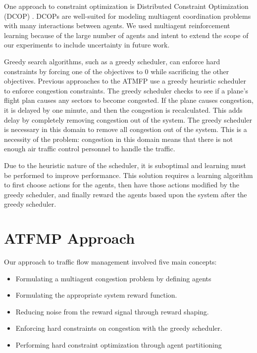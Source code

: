 \documentclass{aamas2014}
\begin{document}
One approach to constraint optimization is Distributed Constraint Optimization (DCOP) \cite{Junges:2008:EPD:1402298.1402308, Modi:2005:AAD:1120120.1120127}. DCOPs are well-suited for modeling multiagent coordination problems with many interactions between agents. We used multiagent reinforcement learning because of the large number of agents and intent to extend the scope of our experiments to include uncertainty in future work.

Greedy search algorithms, such as a greedy scheduler, can enforce hard constraints by forcing one of the objectives to 0 while sacrificing the other objectives. Previous approaches to the ATMFP use a greedy heuristic scheduler \cite{Rios} to enforce congestion constraints. The greedy scheduler checks to see if a plane's flight plan causes any sectors to become congested. If the plane causes congestion, it is delayed by one minute, and then the congestion is recalculated. This adds delay by completely removing congestion out of the system. The greedy scheduler is necessary in this domain to remove all congestion out of the system. This is a necessity of the problem: congestion in this domain means that there is not enough air traffic control personnel to handle the traffic.

Due to the heuristic nature of the scheduler, it is suboptimal and learning must be performed to improve performance. This solution requires a learning algorithm to first choose actions for the agents, then have those actions modified by the greedy scheduler, and finally reward the agents based upon the system after the greedy scheduler.

\section{ATFMP Approach}

Our approach to traffic flow management involved five main concepts: 
\begin{itemize}
\item Formulating a multiagent congestion problem by defining agents
\item Formulating the appropriate system reward function.
\item Reducing noise from the reward signal through reward shaping.
\item Enforcing hard constraints on congestion with the greedy scheduler.
\item Performing hard constraint optimization through agent partitioning
\end{itemize}
\end{document}
